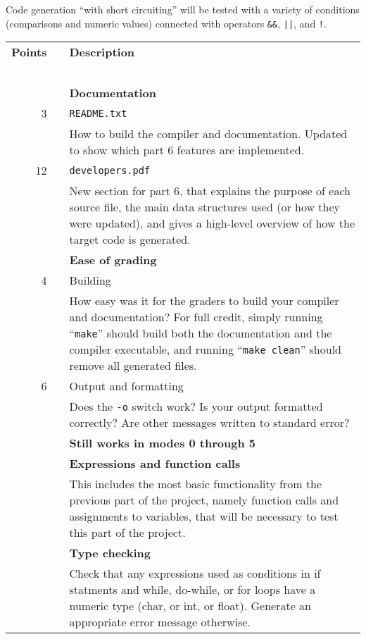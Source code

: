 \documentclass{article}
\makeatletter
\newcommand{\codegen}{5}
\newcommand{\flowgen}{6}
\newcommand{\gradeline}{ \cline{1-2} \cline{4-4} ~\\[-1.5ex] }
\newenvironment{gradetable}{\begin{longtable}{@{~~}rrcp{5in}} \multicolumn{2}{l}{\bf Points} & & {\bf Description}\\ \gradeline}{\end{longtable}}
\newcommand{\mainitem}[2]{\pagebreak[2] {\bf #1} &&& {\bf #2}}
\newcommand{\mainpara}[1]{~ &&& {#1} }
\newcommand{\inneritem}[2]{~ & #1 && #2}
\newcommand{\innerpara}[1]{~ & ~ && #1}
\makeatother
\begin{document}
Code generation ``with short circuiting''
will be tested with a variety of conditions
(comparisons and numeric values)
connected with operators \verb|&&|, \verb+||+, and \verb|!|.


\noindent
\begin{gradetable}
  \mainitem{15}{Documentation}
  \\[1mm]
  \inneritem{3}{\tt README.txt}
  \\[1mm]
  \innerpara{%
    How to build the compiler and documentation.
    Updated to show which part \flowgen{} features are implemented.
  }
  \\[1mm]
  \inneritem{12}{\tt developers.pdf}
  \\[1mm]
  \innerpara{%
    New section for part \flowgen{}, that explains
    the purpose of each source file,
    the main data structures used (or how they were updated),
    and gives a high-level overview of how the target code
    is generated.
  }
  \\[4mm]

  \mainitem{10}{Ease of grading}
  \\[1mm]
  \inneritem{4}{Building}
  \\[1mm]
  \innerpara{%
    How easy was it for the graders to build your compiler and
    documentation?
    For full credit, simply running ``{\tt make}''
    should build both the documentation and the compiler executable,
    and running ``{\tt make clean}'' should remove
    all generated files.
  }
  \\[1mm]
  \inneritem{6}{Output and formatting}
  \\[1mm]
  \innerpara{%
    Does the {\tt -o} switch work?
    Is your output formatted correctly?
    Are other messages written to standard error?
  }
  \\[4mm]

  \mainitem{10}{Still works in modes 0 through \codegen}
  \\[4mm]

  \mainitem{15}{Expressions and function calls}
  \\[1mm]
  \mainpara{%
    This includes the most basic functionality from the previous part of the
    project, namely function calls and assignments to variables,
    that will be necessary to test this part of the project.
  }
  \\[4mm]

  \mainitem{5}{Type checking}
  \\[1mm]
  \mainpara{%
    Check that any expressions used as conditions in if statments
    and while, do-while, or for loops
    have a numeric type (char, or int, or float).
    Generate an appropriate error message otherwise.
  }
  \\[4mm]


\end{gradetable}
\end{document}
